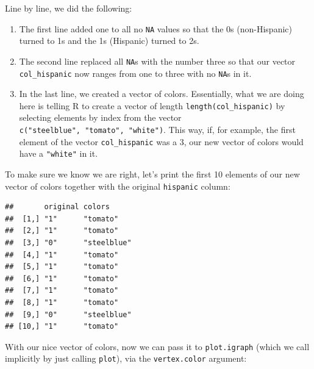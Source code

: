 \documentclass[]{book}
\newenvironment{Shaded}{\begin{snugshade}}{\end{snugshade}}
\newcommand{\DataTypeTok}[1]{\textcolor[rgb]{0.13,0.29,0.53}{#1}}
\newcommand{\DecValTok}[1]{\textcolor[rgb]{0.00,0.00,0.81}{#1}}
\newcommand{\KeywordTok}[1]{\textcolor[rgb]{0.13,0.29,0.53}{\textbf{#1}}}
\newcommand{\NormalTok}[1]{#1}
\newcommand{\OperatorTok}[1]{\textcolor[rgb]{0.81,0.36,0.00}{\textbf{#1}}}
\begin{document}
Line by line, we did the following:

\begin{enumerate}
\def\labelenumi{\arabic{enumi}.}
\item
  The first line added one to all no \texttt{NA} values so that the 0s (non-Hispanic) turned to 1s and the 1s (Hispanic) turned to 2s.
\item
  The second line replaced all \texttt{NA}s with the number three so that our vector \texttt{col\_hispanic} now ranges from one to three with no \texttt{NA}s in it.
\item
  In the last line, we created a vector of colors. Essentially, what we are doing here is telling R to create a vector of length \texttt{length(col\_hispanic)} by selecting elements by index from the vector \texttt{c("steelblue",\ "tomato",\ "white")}. This way, if, for example, the first element of the vector \texttt{col\_hispanic} was a 3, our new vector of colors would have a \texttt{"white"} in it.
\end{enumerate}

To make sure we know we are right, let's print the first 10 elements of our new vector of colors together with the original \texttt{hispanic} column:

\begin{Shaded}
\end{Shaded}

\begin{verbatim}
##       original colors     
##  [1,] "1"      "tomato"   
##  [2,] "1"      "tomato"   
##  [3,] "0"      "steelblue"
##  [4,] "1"      "tomato"   
##  [5,] "1"      "tomato"   
##  [6,] "1"      "tomato"   
##  [7,] "1"      "tomato"   
##  [8,] "1"      "tomato"   
##  [9,] "0"      "steelblue"
## [10,] "1"      "tomato"
\end{verbatim}

With our nice vector of colors, now we can pass it to \texttt{plot.igraph} (which we call implicitly by just calling \texttt{plot}), via the \texttt{vertex.color} argument:
\end{document}
